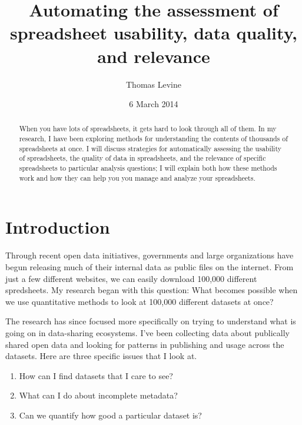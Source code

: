 \documentclass{acm_proc_article-sp}
\begin{document}
\title{Automating the assessment of spreadsheet usability, data quality, and relevance}
\author{ \alignauthor Thomas Levine\\  }
\date{6 March 2014}
\maketitle
\begin{abstract}
When you have lots of spreadsheets, it gets hard to look through all of them.
In my research, I have been exploring methods for understanding the contents
of thousands of spreadsheets at once. I will discuss strategies for automatically
assessing the usability of spreadsheets, the quality of data
in spreadsheets, and the relevance of specific spreadsheets to particular
analysis questions; I will explain both how these methods work and how they
can help you you manage and analyze your spreadsheets.
\end{abstract}


\section{Introduction}
Through recent open data initiatives, governments and large organizations have
begun releasing much of their internal data as public files on the internet.
From just a few different websites, we can easily download 100,000 different
spredsheets.\cite{ny-talk}
My research began with this question: What becomes possible when we use
quantitative methods to look at 100,000 different datasets at once?

The research has since focused more specifically on trying to understand what
is going on in data-sharing ecosystems.
I've been collecting data about publically shared open data
and looking for patterns in publishing and usage across the datasets.
Here are three specific issues that I look at.

\begin{enumerate}
\item How can I find datasets that I care to see?
\item What can I do about incomplete metadata?
\item Can we quantify how good a particular dataset is?
\end{enumerate}
\end{document}
